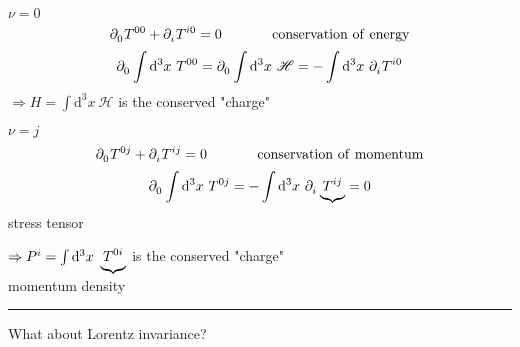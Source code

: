 \documentclass{article}
\begin{document}
\noindent \underline{$\nu = 0$}
\begin{equation*}
    \tensor{\partial}{_0} \tensor{T}{^0^0} + \tensor{\partial}{_i} \tensor{T}{^i^0} = 0 \hspace{0.5in} \mathrm{conservation} ~ \mathrm{of} ~ \mathrm{energy}
\end{equation*}
\begin{equation*}
    \tensor{\partial}{_0} \int \mathrm{d}^3 x~ \tensor{T}{^0^0} = \tensor{\partial}{_0} \int \mathrm{d}^3 x~ \mathscr{H} = - \int \mathrm{d}^3 x~ \tensor{\partial}{_i} \tensor{T}{^i^0}
\end{equation*}
$\Rightarrow H = \int \mathrm{d}^3 x~ \mathscr{H}$ is the conserved "charge"

\noindent \underline{$\nu = j$}
\begin{equation*}
    \tensor{\partial}{_0} \tensor{T}{^0^j} + \tensor{\partial}{_i} \tensor{T}{^i^j} = 0 \hspace{0.5in} \mathrm{conservation} ~ \mathrm{of} ~ \mathrm{momentum}
\end{equation*}
\begin{equation*}
    \tensor{\partial}{_0} \int \mathrm{d}^3 x~ \tensor{T}{^0^j} =  - \int \mathrm{d}^3 x~ \tensor{\partial}{_i} \underbrace{ \tensor{T}{^i^j} } = 0
\end{equation*}
\hspace*{2.7in} {\small stress tensor}

$\Rightarrow \tensor{P}{^i} = \int \mathrm{d}^3 x~ \underbrace{ \tensor{T}{^0^i} }$ is the conserved "charge"
\\ \hspace*{0.75in} {\small momentum density}

\noindent\rule{\textwidth}{.5pt}


\noindent What about Lorentz invariance?
\end{document}
